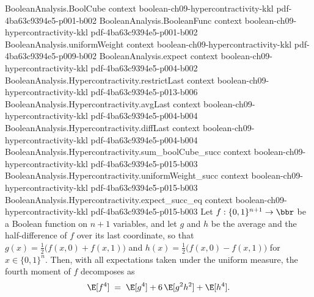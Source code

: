 \begin{lemma}
\leanok
{}
\label{BooleanAnalysis.Hypercontractivity.fourth_moment_decomp}
\proofstep
  {BooleanAnalysis.BoolCube}
  {context}
  {boolean-ch09-hypercontractivity-kkl}
  {pdf-4ba63c9394e5-p001-b002}
\proofstep
  {BooleanAnalysis.BooleanFunc}
  {context}
  {boolean-ch09-hypercontractivity-kkl}
  {pdf-4ba63c9394e5-p001-b002}
\proofstep
  {BooleanAnalysis.uniformWeight}
  {context}
  {boolean-ch09-hypercontractivity-kkl}
  {pdf-4ba63c9394e5-p009-b002}
\proofstep
  {BooleanAnalysis.expect}
  {context}
  {boolean-ch09-hypercontractivity-kkl}
  {pdf-4ba63c9394e5-p004-b002}
\proofstep
  {BooleanAnalysis.Hypercontractivity.restrictLast}
  {context}
  {boolean-ch09-hypercontractivity-kkl}
  {pdf-4ba63c9394e5-p013-b006}
\proofstep
  {BooleanAnalysis.Hypercontractivity.avgLast}
  {context}
  {boolean-ch09-hypercontractivity-kkl}
  {pdf-4ba63c9394e5-p004-b004}
\proofstep
  {BooleanAnalysis.Hypercontractivity.diffLast}
  {context}
  {boolean-ch09-hypercontractivity-kkl}
  {pdf-4ba63c9394e5-p004-b004}
\proofstep
  {BooleanAnalysis.Hypercontractivity.sum_boolCube_succ}
  {context}
  {boolean-ch09-hypercontractivity-kkl}
  {pdf-4ba63c9394e5-p015-b003}
\proofstep
  {BooleanAnalysis.Hypercontractivity.uniformWeight_succ}
  {context}
  {boolean-ch09-hypercontractivity-kkl}
  {pdf-4ba63c9394e5-p015-b003}
\proofstep
  {BooleanAnalysis.Hypercontractivity.expect_succ_eq}
  {context}
  {boolean-ch09-hypercontractivity-kkl}
  {pdf-4ba63c9394e5-p015-b003}
Let $f : \{0,1\}^{n+1} \to \bbr$ be a Boolean function on $n+1$ variables, and let $g$
and $h$ be the average and the half-difference of $f$ over its last coordinate, so that
$g(x) = \tfrac12\bigl(f(x,0) + f(x,1)\bigr)$ and $h(x) = \tfrac12\bigl(f(x,0) -
f(x,1)\bigr)$ for $x \in \{0,1\}^n$. Then, with all expectations taken under the uniform
measure, the fourth moment of $f$ decomposes as
\[
\E[f^4] \;=\; \E[g^4] + 6\,\E[g^2 h^2] + \E[h^4].
\]
\end{lemma}

